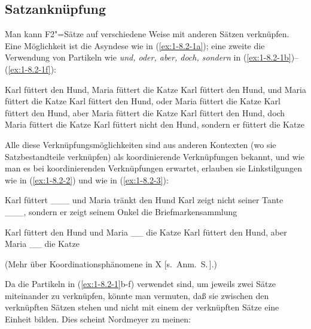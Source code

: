 \documentclass[output=paper]{langsci/langscibook}
\begin{document}
\subsection{Satzanknüpfung}%
\label{subsec:1-8.2}\label{sec-satzanknuepfung}

\addlines%
Man kann F2"=Sätze auf verschiedene Weise mit anderen Sätzen verknüpfen. Eine
Möglichkeit ist die Asyndese wie in (\ref{ex:1-8.2-1a}); eine zweite die Verwendung von Partikeln
wie \textit{und, oder, aber, doch, sondern} in (\ref{ex:1-8.2-1b})–(\ref{ex:1-8.2-1f}):
\begin{exe}
\ex\label{ex:1-8.2-1}
\begin{xlist}
\ex\label{ex:1-8.2-1a} Karl füttert den Hund, Maria füttert die Katze
\ex\label{ex:1-8.2-1b} Karl füttert den Hund, und Maria füttert die Katze
\ex\label{ex:1-8.2-1c} Karl füttert den Hund, oder Maria füttert die Katze
\ex\label{ex:1-8.2-1d} Karl füttert den Hund, aber Maria füttert die Katze
\ex\label{ex:1-8.2-1e} Karl füttert den Hund, doch Maria füttert die Katze
\ex\label{ex:1-8.2-1f} Karl füttert nicht den Hund, sondern er füttert die Katze
\end{xlist}
\end{exe}
Alle diese Verknüpfungsmöglichkeiten sind aus anderen Kontexten (wo sie Satzbestandteile verknüpfen) als koordinierende Verknüpfungen bekannt, und wie man es
bei koordinierenden Verknüpfungen erwartet, erlauben sie Linkstilgungen wie in (\ref{ex:1-8.2-2})
und  wie in (\ref{ex:1-8.2-3}):

\begin{exe}
\ex\label{ex:1-8.2-2}
\begin{xlist}
\ex\label{ex:1-8.2-2a} Karl füttert \_\_\_ und Maria tränkt den Hund
\ex\label{ex:1-8.2-2b} Karl zeigt nicht seiner Tante \_\_\_, sondern er zeigt seinem Onkel die Briefmarkensammlung
\end{xlist}
\end{exe}
\begin{exe}
\ex\label{ex:1-8.2-3}
\begin{xlist}
\ex\label{ex:1-8.2-3a} Karl füttert den Hund und Maria \_\_ die Katze
\ex\label{ex:1-8.2-3b} Karl füttert den Hund, aber Maria \_\_ die Katze
\end{xlist}
\end{exe}
(Mehr über Koordinationsphänomene in X [s.\ Anm.\ S.\,\pageref{fn-herausgeber-topo}].)

Da die Partikeln in (\ref{ex:1-8.2-1}b-f) verwendet
sind, um jeweils zwei Sätze miteinander zu verknüpfen, könnte man
vermuten, daß sie zwischen den verknüpften Sätzen stehen und nicht mit
einem der verknüpften Sätze eine Einheit bilden. Dies scheint
\zb Nordmeyer zu meinen:
\end{document}
